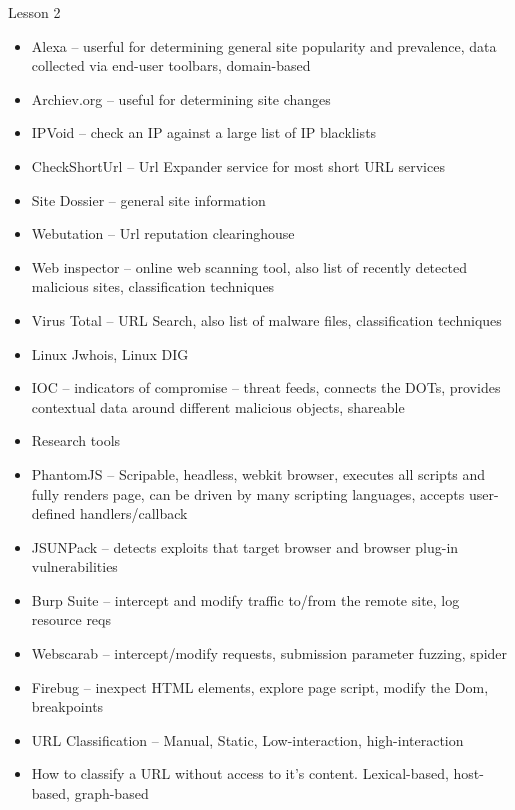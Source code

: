\documentclass[12pt]{article}
\begin{document}
Lesson 2
\begin{itemize}
\item Alexa – userful for determining general site popularity and prevalence, data collected via end-user toolbars, domain-based
\item Archiev.org – useful for determining site changes
\item IPVoid – check an IP against a large list of IP blacklists
\item CheckShortUrl – Url Expander service for most short URL services
\item Site Dossier – general site information
\item Webutation – Url reputation clearinghouse
\item Web inspector – online web scanning tool, also list of recently detected malicious sites, classification techniques
\item Virus Total – URL Search, also list of malware files, classification techniques
\item Linux Jwhois, Linux DIG
\item IOC – indicators of compromise – threat feeds, connects the DOTs, provides contextual data around different malicious objects, shareable
\item Research tools
\item PhantomJS – Scripable, headless, webkit browser, executes all scripts and fully renders page, can be driven by many scripting languages, accepts user-defined handlers/callback
\item JSUNPack – detects exploits that target browser and browser plug-in vulnerabilities
\item Burp Suite – intercept and modify traffic to/from the remote site, log resource reqs
\item Webscarab – intercept/modify requests, submission parameter fuzzing, spider
\item Firebug – inexpect HTML elements, explore page script, modify the Dom, breakpoints
\item URL Classification – Manual, Static, Low-interaction, high-interaction
\item How to classify a URL without access to it’s content. Lexical-based, host-based, graph-based
\end{itemize}
 
\end{document}
